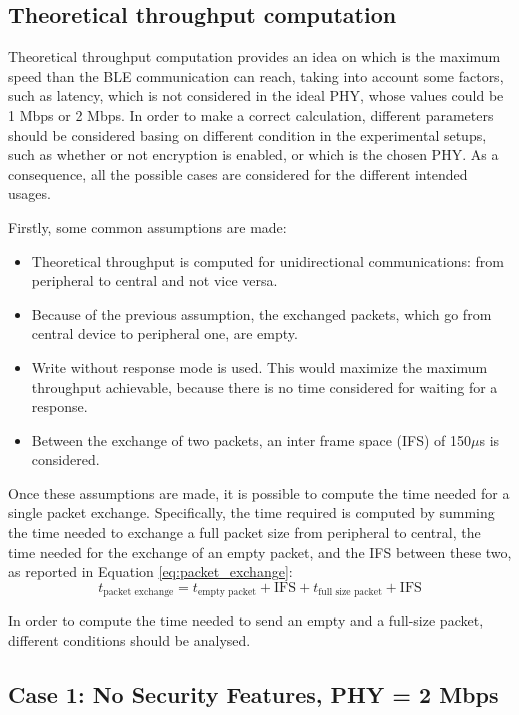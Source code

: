 \documentclass{Configuration_Files/PoliMi3i_thesis}
\begin{document}
\subsection{Theoretical throughput computation}

Theoretical throughput computation provides an idea on which is the maximum speed than the BLE communication can reach, taking into account some factors, such as latency, which is not considered in the ideal PHY, whose values could be 1 Mbps or 2 Mbps. In order to make a correct calculation, different parameters should be considered basing on different condition in the experimental setups, such as whether or not encryption is enabled, or which is the chosen PHY. As a consequence, all the possible cases are considered for the different intended usages.

Firstly, some common assumptions are made:
\begin{itemize}
    \item Theoretical throughput is computed for unidirectional communications: from peripheral to central and not vice versa.
    \item Because of the previous assumption, the exchanged packets, which go from central device to peripheral one, are empty.
    \item Write without response mode is used. This would maximize the maximum throughput achievable, because there is no time considered for waiting for a response.
    \item Between the exchange of two packets, an inter frame space (IFS) of 150$\mu$s is considered.
\end{itemize}

Once these assumptions are made, it is possible to compute the time needed for a single packet exchange. Specifically, the time required is computed by summing the time needed to exchange a full packet size from peripheral to central, the time needed for the exchange of an empty packet, and the IFS between these two, as reported in Equation \ref{eq:packet_exchange}:
\begin{equation}
t_{\text{packet exchange}} = t_{\text{empty packet}} + \text{IFS} + t_{\text{full size packet}} + \text{IFS}
\label{eq:packet_exchange}
\end{equation}

In order to compute the time needed to send an empty and a full-size packet, different conditions should be analysed.

\subsection*{Case 1: No Security Features, PHY = 2 Mbps}
\end{document}
